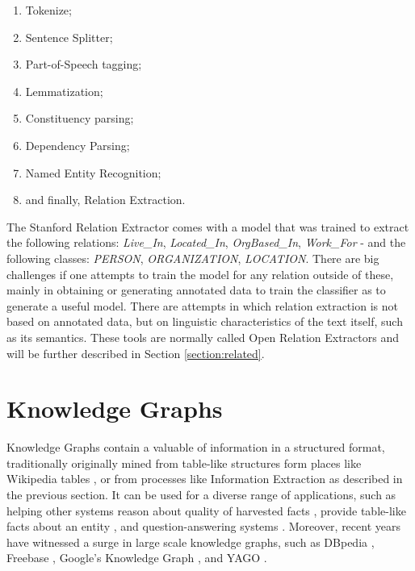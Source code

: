 \documentclass[11pt,a4paper,openright]{memoir}
\begin{document}
\begin{enumerate}
  \item Tokenize;
  \item Sentence Splitter;
  \item Part-of-Speech tagging;
  \item Lemmatization;
  \item Constituency parsing;
  \item Dependency Parsing;
  \item Named Entity Recognition;
  \item and finally, Relation Extraction.
\end{enumerate}

The Stanford Relation Extractor comes with a model that was trained to extract the following relations: \emph{Live\_In}, \emph{Located\_In}, \emph{OrgBased\_In}, \emph{Work\_For} - and the following classes: \emph{PERSON}, \emph{ORGANIZATION}, \emph{LOCATION}. There are big challenges if one attempts to train the model for any relation outside of these, mainly in obtaining or generating annotated data to train the classifier as to generate a useful model. There are attempts in which relation extraction is not based on annotated data, but on linguistic characteristics of the text itself, such as its semantics. These tools are normally called Open Relation Extractors and will be further described in Section \ref{section:related}.


%
%
%
%


\section{Knowledge Graphs}


Knowledge Graphs contain a valuable of information in a structured format, traditionally originally mined from table-like structures form places like Wikipedia \cite{wiki} tables \cite{dbpedia-swj}, or from processes like Information Extraction as described in the previous section. It can be used for a diverse range of applications, such as helping other systems reason about quality of harvested facts \cite{Suchanek2007}, provide table-like facts about an entity \cite{google}, and question-answering systems \cite{hixon-clark-hajishirzi-2015}. Moreover, recent years have witnessed a surge in large scale knowledge graphs, such as DBpedia \cite{dbpedia-swj}, Freebase \cite{Bollacker2008}, Google’s Knowledge Graph \cite{google}, and YAGO \cite{Suchanek2007}.
\end{document}
